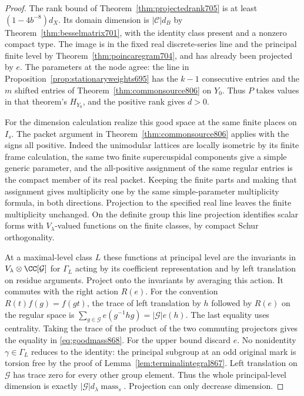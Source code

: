 \documentclass[a4paper,11pt]{article}
\theoremstyle{definition}
\theoremstyle{remark}
\numberwithin{equation}{section}
\begin{document}
\begin{proof}
The rank bound of Theorem~\ref{thm:projectedrank705} is at
least \((1-4b^{-8})d_X\). Its domain dimension is
\(|\mathcal C|d_B\) by Theorem~\ref{thm:besselmatrix701},
with the identity class present and a nonzero compact type.
The image is in the fixed real discrete-series line and the
principal finite level by Theorem~\ref{thm:poincaregram704},
and has already been projected by \(e\). The parameters at
the node agree: the line in Proposition~\ref{prop:stationaryweights695}
has the \(k-1\) consecutive entries and the \(m\) shifted
entries of Theorem~\ref{thm:commonsource806} on \(Y_0\).
Thus \(P\) takes values in that theorem's \(H_{Y_0}\), and
the positive rank gives \(d>0\).

For the dimension calculation realize this good space at
the same finite places on \(I_s\). The packet argument in
Theorem~\ref{thm:commonsource806} applies with the signs all
positive. Indeed the unimodular lattices are locally isometric
by its finite frame calculation, the same two finite
supercuspidal components give a simple generic parameter,
and the all-positive assignment of the same regular entries
is the compact member of its real packet. Keeping the finite
parts and making that assignment gives multiplicity one
by the same simple-parameter multiplicity formula, in both
directions. Projection to the specified real line leaves
the finite multiplicity unchanged. On the definite group
this line projection identifies scalar forms with
\(V_\lambda\)-valued functions on the finite classes, by
compact Schur orthogonality.

At a maximal-level class \(L\) these functions at principal
level are the invariants in
\(V_\lambda\otimes\CC[\mathcal G]\) for \(\Gamma_L\) acting
by its coefficient representation and by left translation
on residue arguments. Project onto the invariants by averaging
this action. It commutes with the right action \(R(e)\).
For the convention \(R(t)f(g)=f(gt)\), the trace of left
translation by \(h\) followed by \(R(e)\) on the regular
space is \(\sum_{g\in\mathcal G} e(g^{-1}hg)=|\mathcal G|e(h)\).
The last equality uses centrality. Taking the trace of the
product of the two commuting projectors gives the equality
in \eqref{eq:goodmass868}. For the upper bound discard \(e\).
No nonidentity \(\gamma\in\Gamma_L\) reduces to the identity:
the principal subgroup at an odd original mark is torsion
free by the proof of Lemma~\ref{lem:terminalintegral867}.
Left translation on \(\mathcal G\) has trace zero for every
other group element. Thus the whole principal-level dimension
is exactly \(|\mathcal G|d_\lambda\operatorname{mass}_s\).
Projection can only decrease dimension.
\end{proof}
\end{document}
